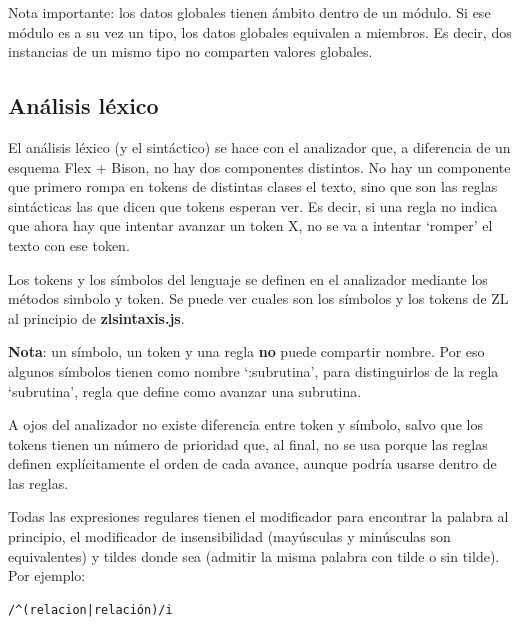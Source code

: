 \documentclass{report}
\begin{document}
	\vspace{10px}
	\noindent
	Nota importante: los datos globales tienen ámbito dentro de un módulo. Si ese módulo es a su vez un tipo, los datos globales equivalen a miembros. Es decir, dos instancias de un mismo tipo no comparten valores globales. 
	
	
	\subsection{Análisis léxico}
	
	El análisis léxico (y el sintáctico) se hace con el analizador que, a diferencia de un esquema Flex + Bison, no hay dos componentes distintos. No hay un componente que primero rompa en tokens de distintas clases el texto, sino que son las reglas sintácticas las que dicen que tokens esperan ver. Es decir, si una regla no indica que ahora hay que intentar avanzar un token X, no se va a intentar `romper' el texto con ese token.
	
	Los tokens y los símbolos del lenguaje se definen en el analizador mediante los métodos simbolo y token. Se puede ver cuales son los símbolos y los tokens de ZL al principio de \textbf{zlsintaxis.js}. 
	
	\vspace{10px}
	\noindent
	\textbf{Nota}: un símbolo, un token y una regla \textbf{no} puede compartir nombre. Por eso algunos símbolos tienen como nombre `:subrutina', para distinguirlos de la regla `subrutina', regla que define como avanzar una subrutina.
	
	\vspace{10px}
	
	A ojos del analizador no existe diferencia entre token y símbolo, salvo que los tokens tienen un número de prioridad que, al final, no se usa porque las reglas definen explícitamente el orden de cada avance, aunque podría usarse dentro de las reglas. 

	\vspace{10px}
	
	Todas las expresiones regulares tienen el modificador para encontrar la palabra al principio, el modificador de insensibilidad (mayúsculas y minúsculas son equivalentes) y tildes donde sea (admitir la misma palabra con tilde o sin tilde). Por ejemplo: 
	
	\begin{BVerbatim}
/^(relacion|relación)/i
	\end{BVerbatim}

	\vspace{10px}
	
\end{document}
